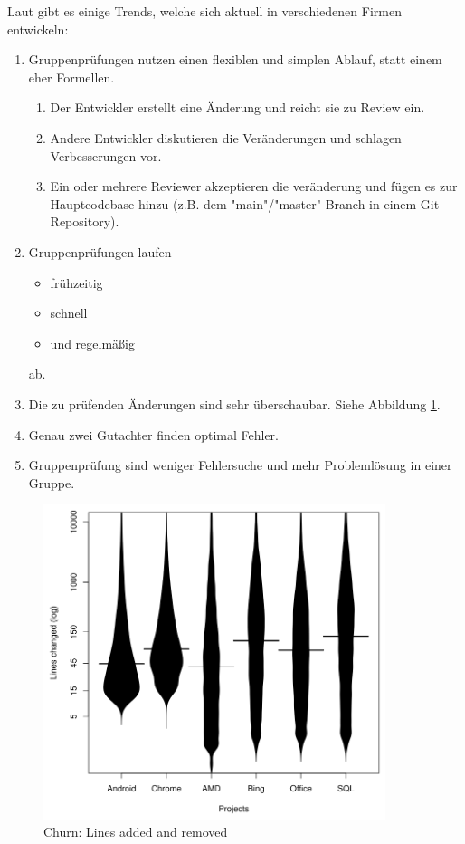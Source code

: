 \documentclass[	%
		fontsize=11pt,  %
		a4paper,	    %
		ngerman,		%
		sans,			%
		f4,				%
	]{HsH-report}		%
\begin{document}
Laut \textcite{rigby:review} gibt es einige Trends, welche sich aktuell in
verschiedenen Firmen entwickeln:

\begin{enumerate}
	\item Gruppenprüfungen nutzen einen flexiblen und simplen Ablauf, statt einem eher
	      Formellen. \begin{enumerate}
		      \item Der Entwickler erstellt eine Änderung und reicht sie zu Review ein.
		      \item Andere Entwickler diskutieren die Veränderungen und schlagen Verbesserungen
		            vor.
		      \item Ein oder mehrere Reviewer akzeptieren die veränderung und fügen es zur
		            Hauptcodebase hinzu (z.B. dem "main"/"master"-Branch in einem Git Repository).
	      \end{enumerate}
	\item Gruppenprüfungen laufen \begin{itemize}
		      \item frühzeitig
		      \item schnell
		      \item und regelmäßig
	      \end{itemize}
	      ab.
	\item Die zu prüfenden Änderungen sind sehr überschaubar. Siehe Abbildung
	      \ref{fig:changes}.
	\item Genau zwei Gutachter finden optimal Fehler.
	\item Gruppenprüfung sind weniger Fehlersuche und mehr Problemlösung in einer Gruppe.
\end{enumerate}

\begin{figure}
	\centering
	\includegraphics[width=10cm]{small_code_changes.png}
	\caption{Churn: Lines added and removed \protect\cite{rigby:review}}
	\label{fig:changes}
\end{figure}
\end{document}
